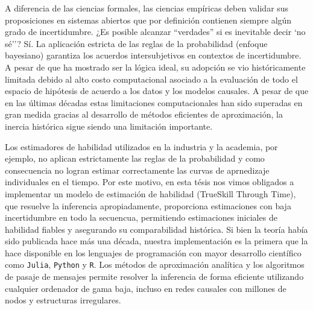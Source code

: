 \documentclass[a4paper,10pt]{book}
\theoremstyle{definition}
\begin{document}

A diferencia de las ciencias formales, las ciencias empíricas deben validar sus proposiciones en sistemas abiertos que por definición contienen siempre algún grado de incertidumbre.
%
¿Es posible alcanzar ``verdades'' si es inevitable decir `no sé''?
%
Sí.
%
La aplicación estricta de las reglas de la probabilidad (enfoque bayesiano) garantiza los acuerdos intersubjetivos en contextos de incertidumbre.
%
A pesar de que ha mostrado ser la lógica ideal, su adopción se vio históricamente limitada debido al alto costo computacional asociado a la evaluación de todo el espacio de hipótesis de acuerdo a los datos y los modelos causales.
%
A pesar de que en las últimas décadas estas limitaciones computacionales han sido superadas en gran medida gracias al desarrollo de métodos eficientes de aproximación, la inercia histórica sigue siendo una limitación importante.


Los estimadores de habilidad utilizados en la industria y la academia, por ejemplo, no aplican estrictamente las reglas de la probabilidad y como consecuencia no logran estimar correctamente las curvas de aprnedizaje individuales en el tiempo.
%
Por este motivo, en esta tésis nos vimos obligados a implementar un modelo de estimación de habilidad (TrueSkill Through Time), que resuelve la inferencia apropiadamente, proporciona estimaciones con baja incertidumbre en todo la secuencua, permitiendo estimaciones iniciales de habilidad fiables y asegurando su comparabilidad hist\'orica.
%
Si bien la teoría había sido publicada hace más una década, nuestra implementaci\'on es la primera que la hace disponible en los lenguajes de programaci\'on con mayor desarrollo cient\'ifico como \texttt{Julia}, \texttt{Python} y \texttt{R}.
%
Los métodos de aproximación analítica y los algoritmos de pasaje de mensajes permite resolver la inferencia de forma eficiente utilizando cualquier ordenador de gama baja, incluso en redes causales con millones de nodos y estructuras irregulares.

\end{document}
